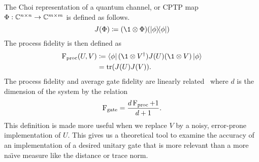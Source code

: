 The Choi representation of a quantum channel, or \ac{CPTP} map $\Phi: \mathbb{C}^{n\times n} \to \mathbb{C}^{m \times m}$ is defined as follows.
\begin{equation}
    J(\Phi) \defeq \qty(\1 \otimes \Phi)(\ketbra{\phi})
\end{equation}
The process fidelity is then defined as
\begin{align}
    \Fid_\text{proc}(U, V) & \defeq \bra{\phi}(\1 \otimes V^\dagger)J(U)(\1 \otimes V)\ket{\phi} \\
                           & = \tr(J(U)J(V)).
\end{align}
The process fidelity and average gate fidelity are linearly related~\cite{fidelity-relation} where $d$ is the dimension of the system by the relation
\begin{equation}
    \operatorname{F}_\text{gate} = \frac{d\operatorname{F}_\text{proc} + 1}{d + 1}.
\end{equation}
This definition is made more useful when we replace $V$ by a noisy, error-prone implementation of $U$.
This gives us a theoretical tool to examine the accuracy of an implementation of a desired unitary gate that is more relevant than a more na\"{\i}ve measure like the distance or trace norm.
